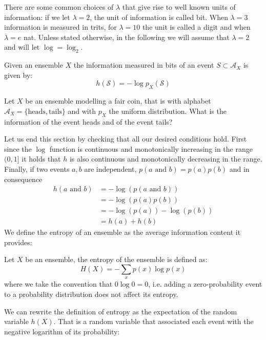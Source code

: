 There are some common choices of $\lambda$ that give rise to well known units of information: if we let $\lambda=2$, the unit of information is called bit. When $\lambda=3$ information is measured in trits, for $\lambda=10$ the unit is called a digit and when $\lambda=e$ nat. Unless stated otherwise, in the following we will assume that $\lambda=2$ and will let $\log=\log_2$.
\begin{definition}
Given an ensemble $X$ the information measured in bits of an event $S\subset \mathcal A_X$ is given by:
\begin{equation}
h(\mathcal S) = -\log p_X(\mathcal S)
\end{equation}
\end{definition}
\begin{exercise}
\label{ex:basicinf}
Let $X$ be an ensemble modelling a fair coin, that is with alphabet $\mathcal A_X=\{\text{heads},\text{tails}\}$ and with $p_X$ the uniform distribution. What is the information of the event heads and of the event tails?
\end{exercise}
Let us end this section by checking that all our desired conditions hold. First since the $\log$ function is continuous and monotonically increasing in the range $(0,1]$ it holds that $h$ is also continuous and monotonically decreasing in the range. Finally, if two events $a,b$ are independent, $p(a \text{ and } b)=p(a)p(b)$ and in consequence 
\begin{align}
h(a \text{ and } b) &= -\log \left(p(a \text{ and } b)\right)\\
                    &= -\log \left(p(a) p(b)\right)\\
                    &= -\log(p(a)) -\log(p(b))\\
                    &= h(a)+h(b)
\end{align}
\label{subsec:entropy}
We define the entropy of an ensemble as the average information content it provides:
\begin{definition} Let $X$ be an ensemble, the entropy of the ensemble is defined as: 
        \begin{equation}\label{eq:entr}
        H({X})=-\sum_{x} p(x)\log p(x)   
        \end{equation}
\noindent where we take the convention that $0\log 0=0$, i.e. adding a  zero-probability event to a probability distribution does not affect its entropy.
\end{definition}
We can rewrite the definition of entropy as the expectation of the random variable $h(X)$. That is a random variable that associated each event with the negative logarithm of its probability: 

